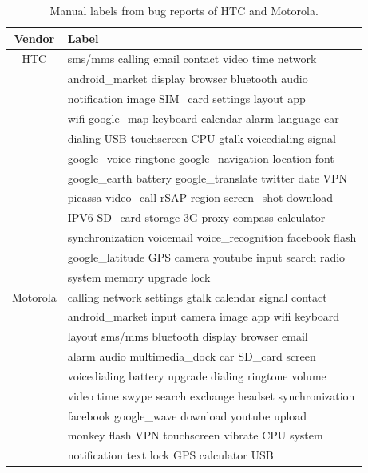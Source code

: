 \documentclass[10pt, conference, compsocconf]{IEEEtran}
\begin{document}
\begin{table}[!t]
\renewcommand{\arraystretch}{1.3}
\caption{Manual labels from bug reports of HTC and Motorola.}
\label{selected1}
\centering
\begin{tabular}{|c||l|}
\hline
Vendor & Label\\
\hline
HTC & sms\//mms calling email contact video time network\\ 
  & android\_market display browser bluetooth audio\\
  & notification image SIM\_card settings layout app\\
  & wifi google\_map keyboard calendar alarm language car\\
  & dialing USB touchscreen CPU gtalk voicedialing signal\\
  & google\_voice ringtone google\_navigation location font\\
  & google\_earth battery google\_translate twitter date VPN\\
  & picassa video\_call rSAP region screen\_shot download\\
  & IPV6 SD\_card storage 3G proxy compass calculator\\
  & synchronization  voicemail  voice\_recognition facebook flash\\
  & google\_latitude GPS camera youtube input search radio\\
  & system memory  upgrade  lock\\
\hline
Motorola & calling network settings gtalk calendar signal contact\\
    & android\_market input camera image app wifi keyboard\\
    & layout sms\//mms bluetooth display browser email\\
& alarm audio multimedia\_dock car SD\_card screen\\
& voicedialing battery upgrade dialing ringtone volume\\
& video time swype search exchange headset synchronization\\
& facebook google\_wave download youtube upload\\
& monkey flash VPN touchscreen vibrate CPU system\\
& notification text lock GPS calculator  USB\\
\hline
\end{tabular}
\end{table}
\end{document}
